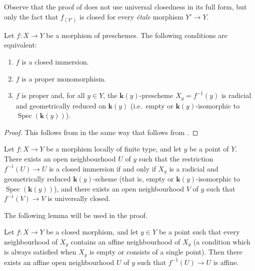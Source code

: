 \begin{remark}[18.12.5]
\label{IV.18.12.5}
Observe that the proof of  does not use universal closedness in its full form, but only the fact that $f_{(Y')}$ is closed for every \emph{\'etale} morphism $Y'\to Y$.
\end{remark}

\begin{corollary}[18.12.6]
\label{IV.18.12.6}
Let $f:X\to Y$ be a morphism of preschemes.
The following conditions are equivalent:
\begin{enumerate}[label=\emph{\alph*)}]
  \item $f$ is a closed immersion.
  \item $f$ is a proper monomorphism.
  \item $f$ is proper and, for all $y\in Y$, the $\boldsymbol{k}(y)$-prescheme $X_y=f^{-1}(y)$ is radicial and geometrically reduced on $\boldsymbol{k}(y)$ (i.e.\ empty or $\boldsymbol{k}(y)$-isomorphic to $\operatorname{Spec}(\boldsymbol{k}(y))$).
\end{enumerate}
\end{corollary}

\begin{proof}
This follows from  in the same way that  follows from .
\end{proof}

\begin{proposition}[18.12.7]
\label{IV.18.12.7}
Let $f:X\to Y$ be a morphism locally of finite type, and let $y$ be a point of $Y$.
There exists an open neighbourhood $U$ of $y$ such that the restriction $f^{-1}(U)\to U$ is a closed immersion if and only if $X_y$ is a radicial and geometrically reduced $\boldsymbol{k}(y)$-scheme (that is, empty or $\boldsymbol{k}(y)$-isomorphic to $\operatorname{Spec}(\boldsymbol{k}(y))$), and there exists an open neighbourhood $V$ of $y$ such that $f^{-1}(V)\to V$ is universally closed.
\end{proposition}

The following lemma will be used in the proof.

\begin{lemma}[18.12.7.1]
\label{IV.18.12.7.1}
Let $f:X\to Y$ be a closed morphism, and let $y\in Y$ be a point such that every neighbourhood of $X_y$ contains an affine neighbourhood of $X_y$ (a condition which is always satisfied when $X_y$ is empty or consists of a single point).
Then there exists an affine open neighbourhood $U$ of $y$ such that $f^{-1}(U)\to U$ is affine.
\end{lemma}

